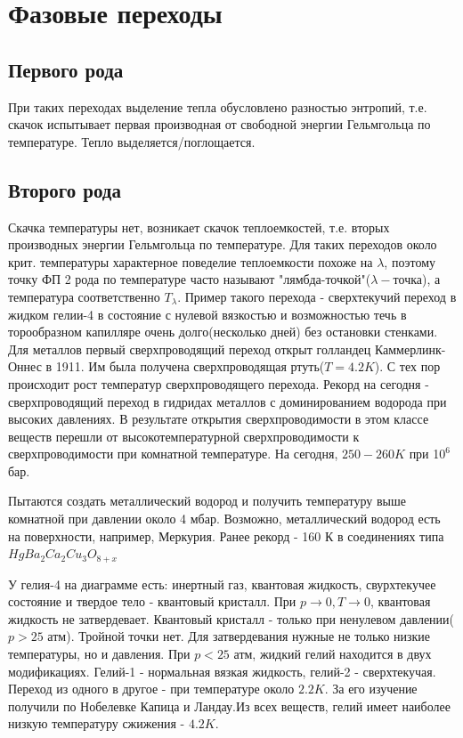 \documentclass{article}
\begin{document}
\section{Фазовые переходы}
\subsection{Первого рода}
При таких переходах выделение тепла обусловлено разностью энтропий, т.е. скачок испытывает первая производная от свободной энергии Гельмгольца по температуре. Тепло выделяется/поглощается.
\subsection{Второго рода}
Скачка температуры нет, возникает скачок теплоемкостей, т.е. вторых производных энергии Гельмгольца по температуре. Для таких переходов около крит. температуры характерное поведелие теплоемкости похоже на $\lambda$, поэтому точку ФП 2 рода по температуре часто называют "лямбда-точкой"($\lambda-$точка), а температура соответственно $T_{\lambda}$. Пример такого перехода - сверхтекучий переход в жидком гелии-4 в состояние с нулевой вязкостью и возможностью течь в торообразном капилляре очень долго(несколько дней) без остановки стенками. Для металлов первый сверхпроводящий переход открыт голландец Каммерлинк-Оннес в 1911. Им была получена сверхпроводящая ртуть($T=4.2K$). С тех пор происходит рост температур сверхпроводящего перехода. Рекорд на сегодня - сверхпроводящий переход в гидридах металлов с доминированием водорода при высоких давлениях. В результате открытия сверхпроводимости в этом классе веществ перешли от высокотемпературной сверхпроводимости к сверхпроводимости при комнатной температуре. На сегодня, $250-260 K$ при 1$0^6$ бар. 

Пытаются создать металлический водород и получить температуру выше комнатной при давлении около 4 мбар. Возможно, металлический водород есть на поверхности, например, Меркурия. Ранее рекорд - 160 К в соединениях типа $HgBa_2Ca_2Cu_3 O_{8+x}$

У гелия-4 на диаграмме есть: инертный газ, квантовая жидкость, свурхтекучее состояние и твердое тело - квантовый кристалл. При $p \to 0, T \to 0$, квантовая жидкость не затвердевает. Квантовый кристалл - только при ненулевом давлении($p>25$ атм). Тройной точки нет. Для затвердевания нужные не только низкие температуры, но и давления. При $p<25$ атм, жидкий гелий находится в двух модификациях. Гелий-1 - нормальная вязкая жидкость, гелий-2 - сверхтекучая. Переход из одного в другое - при температуре около $2.2 K$. За его изучение получили по Нобелевке Капица и Ландау.Из всех веществ, гелий имеет наиболее низкую температуру сжижения - $4.2 K$.
\end{document}
